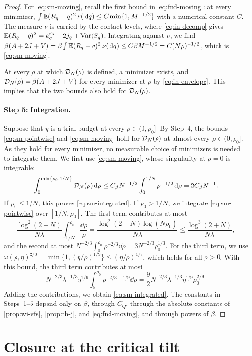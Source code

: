 \begin{proof}
For \eqref{eq:sm-moving}, recall the first bound in
\eqref{eq:fnd-moving}: at every minimizer,
$\int\mathbb E(R_q-q)^2\,\nu(\,\mathrm d q)\le C\min\{1,M^{-1/2}\}$ with a numerical
constant $C$. The measure $\nu$ is carried by the contact levels, where
\eqref{eq:in-decomp} gives $\mathbb E(R_q-q)^2=a^{\rm th}_q+2j_q+\operatorname{Var}(S_q)$.
Integrating against $\nu$, we find
$\beta(A+2J+V)=\beta\int\mathbb E(R_q-q)^2\,\nu(\,\mathrm d q)\le C\beta M^{-1/2}
=C(N\rho)^{-1/2}$, which is \eqref{eq:sm-moving}.

At every $\rho$ at which $\mathcal D_N(\rho)$ is defined, a minimizer
exists, and $\mathcal D_N(\rho)=\beta(A+2J+V)$ for every minimizer at $\rho$
by \eqref{eq:in-envelope}. This implies that the two bounds also hold
for $\mathcal D_N(\rho)$.

\paragraph{Step 5: Integration.} Suppose that $\eta$ is a trial budget
at every $\rho\in(0,\rho_0]$. By Step~4, the bounds \eqref{eq:sm-pointwise}
and \eqref{eq:sm-moving} hold for $\mathcal D_N(\rho)$ at almost every
$\rho\in(0,\rho_0]$. As they hold for every minimizer, no measurable
choice of minimizers is needed to integrate them. We first use
\eqref{eq:sm-moving}, whose singularity at $\rho=0$ is integrable:
\[
 \int_0^{\min\{\rho_0,1/N\}}\mathcal D_N(\rho)\,\mathrm d\rho
 \le C_\beta N^{-1/2}\int_0^{1/N}\rho^{-1/2}\,\mathrm d\rho
 =2C_\beta N^{-1}.
\]
If $\rho_0\le1/N$, this proves \eqref{eq:sm-integrated}. If
$\rho_0>1/N$, we integrate \eqref{eq:sm-pointwise} over $[1/N,\rho_0]$.
The first term contributes at most
\[
 \frac{\log^2(2+N)}{N\lambda}\int_{1/N}^{\rho_0}\frac{\dd\rho}\rho
 =\frac{\log^2(2+N)\log(N\rho_0)}{N\lambda}
 \le\frac{\log^3(2+N)}{N\lambda},
\]
and the second at most
$N^{-2/3}\int_0^{\rho_0}\rho^{-2/3}\dd\rho=3N^{-2/3}\rho_0^{1/3}$. For the
third term, we use
$\omega(\rho,\eta)^{2/3}=\min\{1,(\eta/\rho)^{1/9}\}\le(\eta/\rho)^{1/9}$,
which holds for all $\rho>0$. With this bound, the third term
contributes at most
\[
 N^{-2/3}\lambda^{-1/3}\eta^{1/9}
       \int_0^{\rho_0}\rho^{-2/3-1/9}\dd\rho
 =\frac92N^{-2/3}\lambda^{-1/3}\eta^{1/9}\rho_0^{2/9}.
\]
Adding the contributions, we obtain \eqref{eq:sm-integrated}. The
constants in Steps~1--5 depend only on $\beta$, through $C_Q$, through
the absolute constants of \cref{prop:wi-vfs}, \cref{prop:th-j}, and
\eqref{eq:fnd-moving}, and through powers of $\beta$.
\end{proof}

\section{Closure at the critical tilt}
\label{subsec:b7-general}\label{subsec:b7-main}

